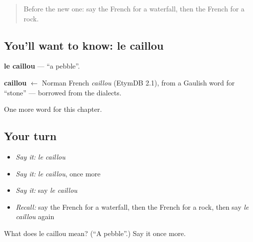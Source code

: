 \begin{quote}
Before the new one: say the French for a waterfall, then the French for a rock.
\end{quote}

\subsection*{You'll want to know: le caillou}
\textbf{le caillou} — \textquotedblleft{}a pebble\textquotedblright{}.

\begin{cousinweb}
\textbf{caillou} $\leftarrow$ Norman French \emph{caillou} (EtymDB 2.1), from a Gaulish word for \textquotedblleft{}stone\textquotedblright{} — borrowed from the dialects.
\end{cousinweb}

\begin{grammarlens}[title={What you've built}]
One more word for this chapter.
\end{grammarlens}

\subsection*{Your turn}
\begin{itemize}
\raggedright
  \item \emph{Say it:} \emph{le caillou}
  \item \emph{Say it:} \emph{le caillou}, once more
  \item \emph{Say it:} say \emph{le caillou}
  \item \emph{Recall:} say the French for a waterfall, then the French for a rock, then say \emph{le caillou} again
\end{itemize}

\begin{tcolorbox}[breakable,colback=teal!4,colframe=teal!35!black,title={Before you move on}]
What does le caillou mean? (\textquotedblleft{}A pebble\textquotedblright{}.) Say it once more.
\end{tcolorbox}

